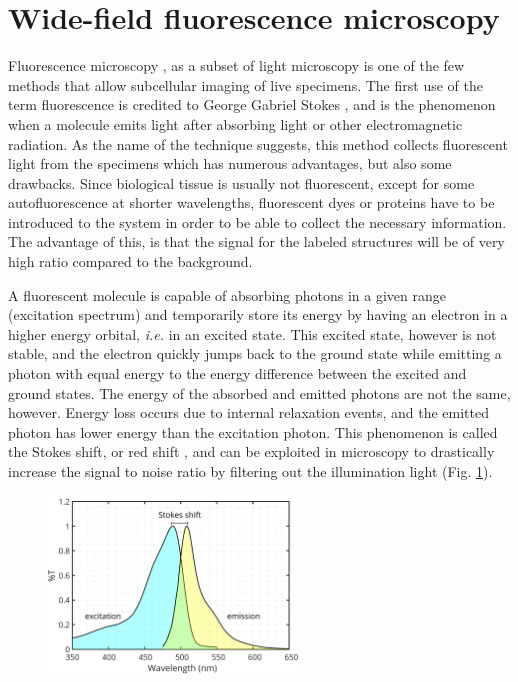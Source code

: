 \section{Wide-field fluorescence microscopy}
  Fluorescence microscopy \cite{lichtman_fluorescence_2005,diaspro_optical_2011}, as a subset of light microscopy is one of the few methods that allow subcellular imaging of live specimens. The first use of the term fluorescence is credited to  George Gabriel Stokes \cite{stokes_change_1852}, and is the phenomenon when a molecule emits light after absorbing light or other electromagnetic radiation. As the name of the technique suggests, this method collects fluorescent light from the specimens which has numerous advantages, but also some drawbacks. Since biological tissue is usually not fluorescent, except for some autofluorescence at shorter wavelengths, fluorescent dyes or proteins have to be introduced to the system in order to be able to collect the necessary information. The advantage of this, is that the signal for the labeled structures will be of very high ratio compared to the background.

  A fluorescent molecule is capable of absorbing photons in a given range (excitation spectrum) and temporarily store its energy by having an electron in  a higher energy orbital, \textit{i.e.} in an excited state. This excited state, however is not stable, and the electron quickly jumps back to the ground state while emitting a photon with equal energy to the energy difference between the excited and ground states. The energy of the absorbed and emitted photons are not the same, however. Energy loss occurs due to internal relaxation events, and the emitted photon has lower energy than the excitation photon. This phenomenon is called the Stokes shift, or red shift \cite{stokes}, and can be exploited in microscopy to drastically increase the signal to noise ratio by filtering out the illumination light (Fig. \ref{fig:spectrum}).

  \begin{figure}
    \centering
    \includegraphics[width=0.6\textwidth]{spectrum/egfp}
    \label{fig:spectrum}
  \end{figure}

